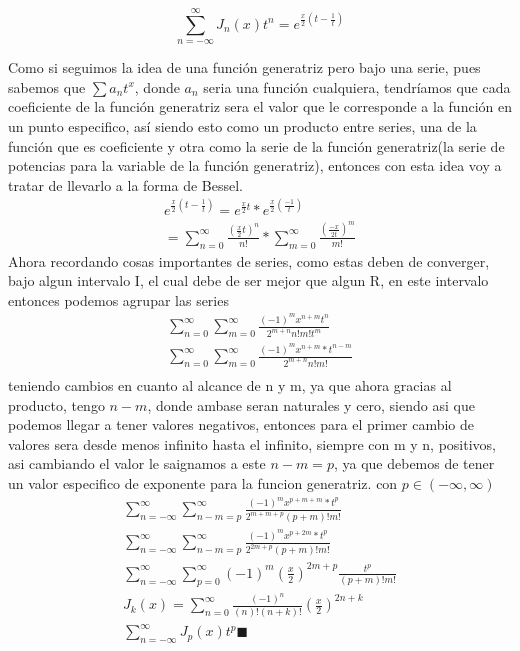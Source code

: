 

\begin{prob}
 $$\sum_{n=-\infty}^{\infty}J_{n}(x)t^n= e^{\frac{x}{2} \left( t-\frac{1}{t} \right)}$$

\end{prob}
\begin{mdframed}
Como si seguimos la idea de una función generatriz pero bajo una serie, pues sabemos que $\sum a_n t^x$, donde $a_n$ seria una función cualquiera, tendríamos que cada coeficiente de la función generatriz sera el valor que le corresponde a la función en un punto especifico, así siendo esto como un producto entre series, una de la función que es coeficiente y otra como la serie de la función generatriz(la serie de potencias para la variable de la función generatriz), entonces con esta idea voy a tratar de llevarlo a la forma de Bessel.
\begin{gather*}
    e^{\frac{x}{2} \left( t-\frac{1}{t} \right)} = e^{\frac{x}{2}t}*e^{\frac{x}{2}\left(\frac{-1}{t} \right)}\\
    =\sum_{n=0}^{\infty}\frac{\left({\frac{x}{2}t}\right)^{n}}{n!}*\sum_{m=0}^{\infty}\frac{\left({\frac{-x}{2t}}\right)^{m}}{m!}
\end{gather*}
Ahora recordando cosas importantes de series, como estas deben de converger, bajo algun intervalo I, el cual debe de ser mejor que algun R, en este intervalo entonces podemos agrupar las series
\begin{gather*}
    \sum_{n=0}^{\infty}\sum_{m=0}^{\infty}\frac{(-1)^{m}{x}^{n+m}t^n}{2^{m+n}n!m!t^m}\\
    \sum_{n=0}^{\infty}\sum_{m=0}^{\infty}\frac{(-1)^{m}{x}^{n+m}*t^{n-m}}{2^{m+n}n!m!}\\
\end{gather*}
teniendo cambios en cuanto al alcance de n y m, ya que ahora gracias al producto, tengo $n-m$, donde ambase seran naturales y cero, siendo asi que podemos llegar a tener valores negativos, entonces para el primer cambio de valores sera desde menos infinito hasta el infinito, siempre con m y n, positivos, asi cambiando el valor le saignamos a este $n-m =p$, ya que debemos de tener un valor especifico de exponente para la funcion generatriz. con $p \in (-\infty, \infty)$
\begin{gather*}
    \sum_{n=-\infty}^{\infty}\sum_{n-m=p}^{\infty}\frac{(-1)^{m}{x}^{p+m+m}*t^{p}}{2^{m+m+p}(p+m)!m!}\\
    \sum_{n=-\infty}^{\infty}\sum_{n-m=p}^{\infty}\frac{(-1)^{m}{x}^{p+2m}*t^{p}}{2^{2m+p}(p+m)!m!}\\
    \sum_{n=-\infty}^{\infty}\sum_{p=0}^{\infty}(-1)^{m}\left(\frac{{x}}{2}\right)^{2m+p}\frac{t^{p}}{(p+m)!m!}\\
    J_{k}(x) =\sum_{n=0}^\infty \frac{(-1)^n}{(n)!(n+k)!}(\frac{x}{2})^{2n+k}\\
    \sum_{n=-\infty}^{\infty}J_{p}(x){t^{p}}\blacksquare\\
\end{gather*}
\end{mdframed}
